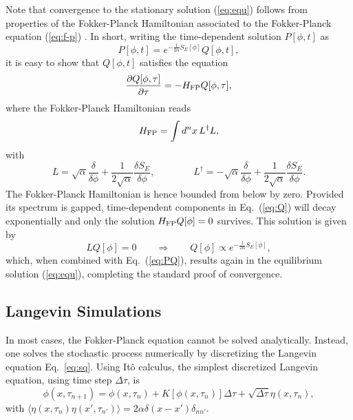 {
Note that convergence to the stationary solution (\ref{eq:equ}) follows from properties of the Fokker-Planck Hamiltonian associated to the Fokker-Planck equation (\ref{eq:f-p}) \cite{Damgaard:1987rr}. In short, writing the time-dependent solution $P[\phi,t]$ as 
\begin{equation}
\label{eq:PQ}
P[\phi,t]=e^{-\frac{1}{2\alpha}S_E[\phi]} Q[\phi,t],
\end{equation}
it is easy to show that $Q[\phi,t]$ satisfies the equation
\begin{equation}
\label{eq:Q}
\frac{\partial Q[\phi, \tau]}{\partial \tau}  = -H_{\rm FP}Q[\phi, \tau],
\end{equation}
where the Fokker-Planck Hamiltonian reads
\begin{equation}
H_{\rm FP} = \int d^nx\, L^\dagger L,
\end{equation}
with
\begin{equation}
L = \sqrt{\alpha}\frac{\delta}{\delta \phi} + \frac{1}{2\sqrt{\alpha}}\frac{\delta S_E}{\delta\phi}, 
\qquad\qquad
L^\dagger = -\sqrt{\alpha}\frac{\delta}{\delta \phi} + \frac{1}{2\sqrt{\alpha}}\frac{\delta S_E}{\delta
\phi}. 
\end{equation}
The Fokker-Planck Hamiltonian is hence bounded from below by zero. Provided its spectrum is gapped, time-dependent components in Eq.~(\ref{eq:Q}) will decay exponentially and only the solution $H_{\rm FP}Q[\phi]=0$ survives. This solution is given by
\begin{equation}
LQ[\phi]=0 \qquad \Rightarrow \qquad Q[\phi] \propto 
e^{-\frac{1}{2\alpha}S_E[\phi]},
\end{equation}
which, when combined with Eq.~(\ref{eq:PQ}),
results again in the equilibrium solution (\ref{eq:equ}), completing the standard proof of convergence.
}

\subsection{Langevin Simulations}
\label{subsec:sim}

In most cases, the Fokker-Planck equation cannot be solved analytically. Instead, one solves the stochastic process numerically by discretizing the Langevin equation Eq.~\eqref{eq:sq}. 
Using It\^o calculus, the simplest discretized Langevin equation, using time step $\Delta\tau$, is
\begin{equation}
    \phi(x,\tau_{n+1}) = \phi(x,\tau_n) + K[\phi(x,\tau_n)]\Delta\tau + \sqrt{\Delta\tau}\eta(x,\tau_n),
    \label{eq:dis-sq}
\end{equation}
with $\langle \eta(x,\tau_n)\eta(x',\tau_{n'}) \rangle = 2\alpha\delta(x-x')\delta_{nn'}$. 

